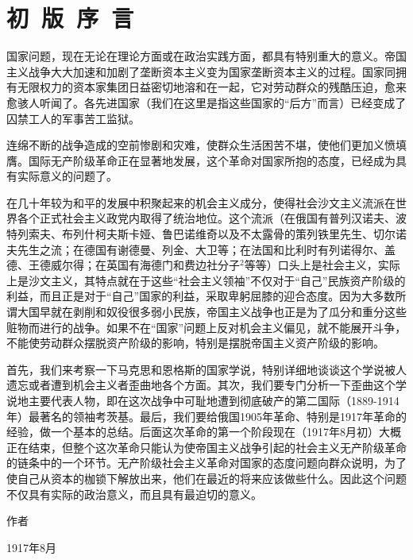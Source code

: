 \chapter[初版序言]{初~版~序~言} %


国家问题，现在无论在理论方面或在政治实践方面，都具有特别重大的意义。帝国主义战争大大加速和加剧了垄断资本主义变为国家垄断资本主义的过程。国家同拥有无限权力的资本家集团日益密切地溶和在一起，它对劳动群众的残酷压迫，愈来愈骇人听闻了。各先进国家（我们在这里是指这些国家的“后方”而言）已经变成了囚禁工人的军事苦工监狱。

连绵不断的战争造成的空前惨剧和灾难，使群众生活困苦不堪，使他们更加义愤填膺。国际无产阶级革命正在显著地发展，这个革命对国家所抱的态度，已经成为具有实际意义的问题了。

在几十年较为和平的发展中积聚起来的机会主义成分，使得社会沙文主义流派在世界各个正式社会主义政党内取得了统治地位。这个流派（在俄国有普列汉诺夫、波特列索夫、布列什柯夫斯卡娅、鲁巴诺维奇以及不太露骨的策列铁里先生、切尔诺夫先生之流；在德国有谢德曼、列金、大卫等；在法国和比利时有列诺得尔、盖德、王德威尔得；在英国有海德门和费边社分子$^{2}$等等）口头上是社会主义，实际上是沙文主义，其特点就在于这些“社会主义领袖”不仅对于“自己”民族资产阶级的利益，而且正是对于“自己”国家的利益，采取卑躬屈膝的迎合态度。因为大多数所谓大国早就在剥削和奴役很多弱小民族，帝国主义战争也正是为了瓜分和重分这些赃物而进行的战争。如果不在“国家”问题上反对机会主义偏见，就不能展开斗争，不能使劳动群众摆脱资产阶级的影响，特别是摆脱帝国主义资产阶级的影响。

首先，我们来考察一下马克思和恩格斯的国家学说，特别详细地谈谈这个学说被人遗忘或者遭到机会主义者歪曲地各个方面。其次，我们要专门分析一下歪曲这个学说地主要代表人物，即在这次战争中可耻地遭到彻底破产的第二国际（1889-1914年）最著名的领袖考茨基。最后，我们要给俄国1905年革命、特别是1917年革命的经验，做一个基本的总结。后面这次革命的第一个阶段现在（1917年8月初）大概正在结束，但整个这次革命只能认为使帝国主义战争引起的社会主义无产阶级革命的链条中的一个环节。无产阶级社会主义革命对国家的态度问题向群众说明，为了使自己从资本的枷锁下解放出来，他们在最近的将来应该做些什么。因此这个问题不仅具有实际的政治意义，而且具有最迫切的意义。

\mbox{} 

\leftskip=80mm 作者

\leftskip=73mm 1917年8月

\leftskip=0mm